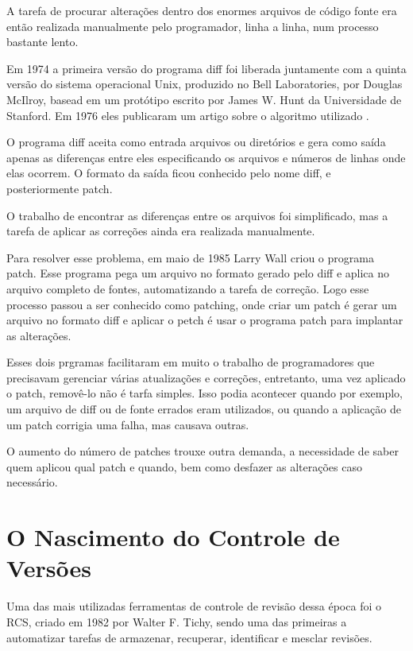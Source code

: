 A tarefa de procurar alterações dentro dos enormes arquivos de código fonte
era então realizada manualmente pelo programador, linha a linha, num processo
bastante lento.

Em 1974 a primeira versão do programa diff foi liberada juntamente com a quinta
versão do sistema operacional Unix, produzido no Bell Laboratories, por Douglas
McIlroy, basead em um protótipo escrito por James W. Hunt da Universidade de
Stanford. Em 1976 eles publicaram um artigo sobre o algoritmo utilizado \cite{Hunt}.

O programa diff aceita como entrada arquivos ou diretórios e gera como saída
apenas as diferenças entre eles especificando os arquivos e números de linhas
onde elas ocorrem. O formato da saída ficou conhecido pelo nome diff, e
posteriormente patch.

O trabalho de encontrar as diferenças entre os arquivos foi simplificado, mas
a tarefa de aplicar as correções ainda era realizada manualmente.

Para resolver esse problema, em maio de 1985 Larry Wall criou o programa patch.
Esse programa pega um arquivo no formato gerado pelo diff e aplica no arquivo
completo de fontes, automatizando a tarefa de correção. Logo esse processo
passou a ser conhecido como patching, onde criar um patch é gerar um arquivo
no formato diff e aplicar o petch é usar o programa patch para implantar as
alterações.

Esses dois prgramas facilitaram em muito o trabalho de programadores que
precisavam gerenciar várias atualizações e correções, entretanto, uma vez
aplicado o patch, removê-lo não é tarfa simples. Isso podia acontecer quando
por exemplo, um arquivo de diff ou de fonte errados eram utilizados, ou
quando a aplicação de um patch corrigia uma falha, mas causava outras.

O aumento do número de patches trouxe outra demanda, a necessidade de
saber quem aplicou qual patch e quando, bem como desfazer as alterações
caso necessário.


\section{O Nascimento do Controle de Versões}

Uma das mais utilizadas ferramentas de controle de revisão dessa época
foi o RCS, criado em 1982 por Walter F. Tichy, sendo uma das primeiras
a automatizar tarefas de armazenar, recuperar, identificar e mesclar
revisões.

